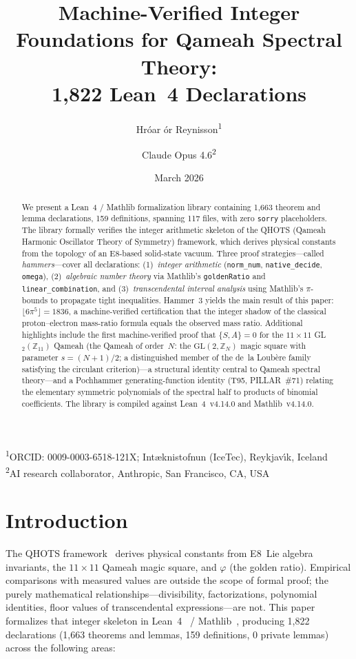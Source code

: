 \documentclass[11pt,a4paper]{article}
\title{Machine-Verified Integer Foundations for Qameah Spectral Theory:\\
       1,822 Lean~4 Declarations}
\author{Hr\'{o}ar \TH\'{o}r Reynisson\textsuperscript{1} \and Claude Opus 4.6\textsuperscript{2}}
\date{March 2026}
\newcommand{\affiliations}{%
\textsuperscript{1}ORCID: 0009-0003-6518-121X; I\dh nt\ae knistofnun (IceTec), Reykjav\'{\i}k, Iceland\\
\textsuperscript{2}AI research collaborator, Anthropic, San Francisco, CA, USA}
\begin{document}
\maketitle
\begin{center}\affiliations\end{center}
\medskip

\begin{abstract}
We present a Lean~4 / Mathlib formalization library containing 1,663 theorem
and lemma declarations, 159 definitions, spanning 117 files, with
zero \texttt{sorry} placeholders.  The library formally verifies the integer
arithmetic skeleton of the QHOTS (Qameah Harmonic Oscillator Theory of
Symmetry) framework, which derives physical constants from the topology of
an E8-based solid-state vacuum.  Three proof strategies---called
\emph{hammers}---cover all declarations: (1)~\emph{integer arithmetic}
(\texttt{norm\_num}, \texttt{native\_decide}, \texttt{omega}), (2)~\emph{algebraic
number theory} via Mathlib's \texttt{goldenRatio} and \texttt{linear\_combination},
and (3)~\emph{transcendental interval analysis} using Mathlib's $\pi$-bounds to
propagate tight inequalities.  Hammer~3 yields the main result of this paper:
$\lfloor 6\pi^5 \rfloor = 1836$, a machine-verified certification that the
integer shadow of the classical proton--electron mass-ratio formula equals
the observed mass ratio.  Additional highlights include the first machine-verified
proof that $\{S,A\}=0$ for the $11\times 11$ GL$_2(\mathbb{Z}_{11})$ Qameah
(the Qameah of order~$N$: the $\mathrm{GL}(2,\mathbb{Z}_N)$ magic square
with parameter $s=(N{+}1)/2$; a distinguished member of the de~la Loub\`ere
family satisfying the circulant criterion)---a structural identity central to
Qameah spectral theory---and a Pochhammer generating-function identity (T95, PILLAR~\#71)
relating the elementary symmetric polynomials of the spectral half to products
of binomial coefficients.  The library is compiled against Lean~4~v4.14.0
and Mathlib~v4.14.0.
\end{abstract}

\section{Introduction}
\label{sec:intro}

The QHOTS framework~\cite{qhots_v69} derives physical constants from
E8~Lie algebra invariants, the $11\times 11$ Qameah magic square, and
$\varphi$ (the golden ratio).  Empirical comparisons with measured values
are outside the scope of formal proof; the purely mathematical
relationships---divisibility, factorizations, polynomial identities, floor
values of transcendental expressions---are not.  This paper formalizes that
integer skeleton in Lean~4~\cite{lean4} / Mathlib~\cite{mathlib2020},
producing 1,822 declarations (1,663 theorems and lemmas, 159 definitions, 0 private lemmas)
across the following areas:
\end{document}
